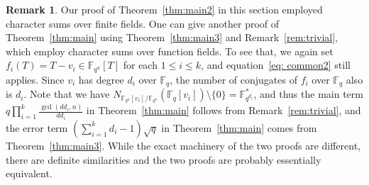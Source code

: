 \documentclass[12pt,reqno]{amsart}
\theoremstyle{definition}
\newtheorem{rem}[thm]{Remark}
\newcommand{\F}{\mathbb{F}}
\begin{document}
\begin{rem}
Our proof of Theorem~\ref{thm:main2} in this section employed character sums over finite fields. One can give another proof of Theorem~\ref{thm:main} using Theorem~\ref{thm:main3} and Remark~\ref{rem:trivial}, which employ character sums over function fields. To see that, we again set $f_i(T)=T-v_i \in \F_{q^n}[T]$ for each $1\leq i \leq k$, and equation~\eqref{eq: common2} still applies. Since $v_i$ has degree $d_i$ over $\F_q$, the number of conjugates of $f_i$ over $\F_q$ also is $d_i$. Note that we have $N_{\F_{q^n}[v_i]/\F_{q^n}}(\F_q[v_i]) \setminus \{0\}=\F_{q^{d_i}}^*$, and thus the main term $q \prod_{i=1}^k  \frac{\gcd(dd_i,n)}{dd_i}$ in Theorem~\ref{thm:main} follows from Remark~\ref{rem:trivial}, and the error term $(\sum_{i=1}^k d_i{}-1)\sqrt{q}$ in Theorem~\ref{thm:main} comes from Theorem~\ref{thm:main3}. While the exact machinery of the two proofs are different, there are definite similarities and the two proofs are probably essentially equivalent.
\end{rem}
\end{document}
